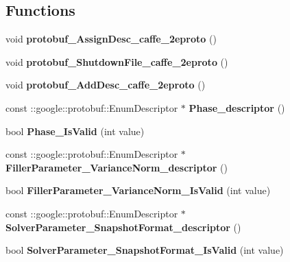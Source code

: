 \subsection*{Functions}
\begin{DoxyCompactItemize}
\item 
\mbox{\label{namespacecaffe_aeea8240514bf0dc137767cbfbb177591}} 
void {\bfseries protobuf\+\_\+\+Assign\+Desc\+\_\+caffe\+\_\+2eproto} ()
\item 
\mbox{\label{namespacecaffe_a2497ec79fe6889397d469c3816194c48}} 
void {\bfseries protobuf\+\_\+\+Shutdown\+File\+\_\+caffe\+\_\+2eproto} ()
\item 
\mbox{\label{namespacecaffe_ad1a91875e706570edafc9bf708e1366b}} 
void {\bfseries protobuf\+\_\+\+Add\+Desc\+\_\+caffe\+\_\+2eproto} ()
\item 
\mbox{\label{namespacecaffe_a3c60aa70c57c46fb77284d9829f70820}} 
const \+::google\+::protobuf\+::\+Enum\+Descriptor $\ast$ {\bfseries Phase\+\_\+descriptor} ()
\item 
\mbox{\label{namespacecaffe_a3bbba992cb28fa9ae30b39b24af7077d}} 
bool {\bfseries Phase\+\_\+\+Is\+Valid} (int value)
\item 
\mbox{\label{namespacecaffe_a4c460dc5928aa58a043ae8d47ed52195}} 
const \+::google\+::protobuf\+::\+Enum\+Descriptor $\ast$ {\bfseries Filler\+Parameter\+\_\+\+Variance\+Norm\+\_\+descriptor} ()
\item 
\mbox{\label{namespacecaffe_a3ee5408ec3d62b78c6db817f4cf62158}} 
bool {\bfseries Filler\+Parameter\+\_\+\+Variance\+Norm\+\_\+\+Is\+Valid} (int value)
\item 
\mbox{\label{namespacecaffe_a92fc018f9ec24644ed879f7e34a8bfd0}} 
const \+::google\+::protobuf\+::\+Enum\+Descriptor $\ast$ {\bfseries Solver\+Parameter\+\_\+\+Snapshot\+Format\+\_\+descriptor} ()
\item 
\mbox{\label{namespacecaffe_adb8153609a39adab2bd9da40f9f06637}} 
bool {\bfseries Solver\+Parameter\+\_\+\+Snapshot\+Format\+\_\+\+Is\+Valid} (int value)

\end{DoxyCompactItemize}
